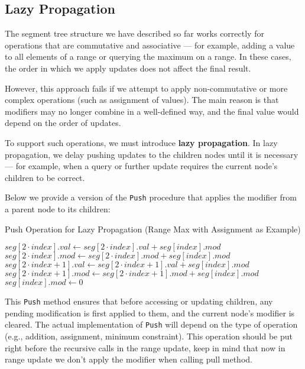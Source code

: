 \documentclass[11pt]{article}
\begin{document}
\subsection{Lazy Propagation}

The segment tree structure we have described so far works correctly for operations that are commutative and associative --- for example, adding a value to all elements of a range or querying the maximum on a range. In these cases, the order in which we apply updates does not affect the final result.

However, this approach fails if we attempt to apply non-commutative or more complex operations (such as assignment of values). The main reason is that modifiers may no longer combine in a well-defined way, and the final value would depend on the order of updates.

To support such operations, we must introduce \textbf{lazy propagation}. In lazy propagation, we delay pushing updates to the children nodes until it is necessary --- for example, when a query or further update requires the current node's children to be correct.

\vspace{1em}

\noindent Below we provide a version of the \texttt{Push} procedure that applies the modifier from a parent node to its children:

\begin{algorithm}[H]
    \caption{Push Operation for Lazy Propagation (Range Max with Assignment as Example)}
    \begin{algorithmic}
                \State $seg[2 \cdot index].val \gets seg[2 \cdot index].val + seg[index].mod$
                \State $seg[2 \cdot index].mod \gets seg[2 \cdot index].mod + seg[index].mod$
                \State $seg[2 \cdot index + 1].val \gets seg[2 \cdot index + 1].val + seg[index].mod$
                \State $seg[2 \cdot index + 1].mod \gets seg[2 \cdot index + 1].mod + seg[index].mod$
                \State $seg[index].mod \gets 0$
            \EndIf
        \EndProcedure
    \end{algorithmic}
\end{algorithm}

\noindent
This \texttt{Push} method ensures that before accessing or updating children, any pending modification is first applied to them, and the current node's modifier is cleared. The actual implementation of \texttt{Push} will depend on the type of operation (e.g., addition, assignment, minimum constraint).
This operation should be put right before the recursive calls in the range update, keep in mind that now in range update we don't apply the modifier when calling pull method.
\end{document}
